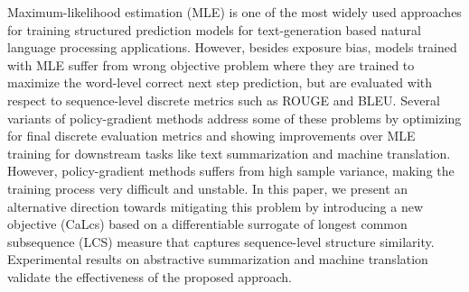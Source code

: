 Maximum-likelihood estimation (MLE) is one of the most widely used approaches for training structured prediction models for text-generation based natural language processing applications. However, besides exposure bias, models trained with MLE suffer from wrong objective problem where they are trained to maximize the word-level correct next step prediction, but are evaluated with respect to sequence-level discrete metrics such as ROUGE and BLEU. Several variants of policy-gradient methods address some of these problems by optimizing for final discrete evaluation metrics and showing improvements over MLE training for downstream tasks like text summarization and machine translation. However, policy-gradient methods suffers from high sample variance, making the training process very difficult and unstable.  In this paper, we present an alternative direction towards mitigating this problem by introducing a new objective (CaLcs) based on a differentiable surrogate of longest common subsequence (LCS) measure that captures sequence-level structure similarity. Experimental results on abstractive summarization and machine translation validate the effectiveness of the proposed approach.
